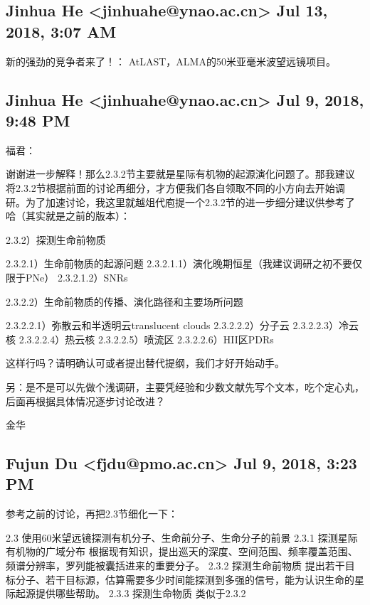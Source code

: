 \documentclass{article}
\newcommand\from[2]{\subsection{{#1} {#2}}}
\newcommand\said[1]{#1}
\begin{document}
\from{
Jinhua He <jinhuahe@ynao.ac.cn>
}{
Jul 13, 2018, 3:07 AM
}
\said{
新的强劲的竞争者来了！：
AtLAST，ALMA的50米亚毫米波望远镜项目。
}

\from{
Jinhua He <jinhuahe@ynao.ac.cn>
}{
Jul 9, 2018, 9:48 PM
}
\said{
福君：

谢谢进一步解释！那么2.3.2节主要就是星际有机物的起源演化问题了。那我建议将2.3.2节根据前面的讨论再细分，才方便我们各自领取不同的小方向去开始调研。为了加速讨论，我这里就越俎代庖提一个2.3.2节的进一步细分建议供参考了哈（其实就是之前的版本）：

2.3.2）探测生命前物质

2.3.2.1）生命前物质的起源问题
2.3.2.1.1）演化晚期恒星（我建议调研之初不要仅限于PNe）
2.3.2.1.2）SNRs

2.3.2.2）生命前物质的传播、演化路径和主要场所问题

2.3.2.2.1）弥散云和半透明云translucent clouds
2.3.2.2.2）分子云
2.3.2.2.3）冷云核
2.3.2.2.4）热云核
2.3.2.2.5）喷流区
2.3.2.2.6）HII区PDRs

这样行吗？请明确认可或者提出替代提纲，我们才好开始动手。

另：是不是可以先做个浅调研，主要凭经验和少数文献先写个文本，吃个定心丸，后面再根据具体情况逐步讨论改进？

金华
}

\from{
Fujun Du <fjdu@pmo.ac.cn>
}{
Jul 9, 2018, 3:23 PM
}
\said{
参考之前的讨论，再把2.3节细化一下：

2.3 使用60米望远镜探测有机分子、生命前分子、生命分子的前景
2.3.1 探测星际有机物的广域分布
根据现有知识，提出巡天的深度、空间范围、频率覆盖范围、频谱分辨率，罗列能被囊括进来的重要分子。
2.3.2 探测生命前物质
提出若干目标分子、若干目标源，估算需要多少时间能探测到多强的信号，能为认识生命的星际起源提供哪些帮助。
2.3.3 探测生命物质
类似于2.3.2
}
\end{document}
